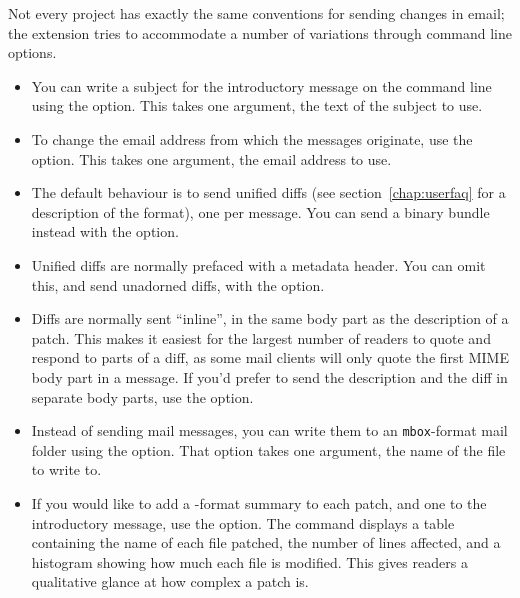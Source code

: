 Not every project has exactly the same conventions for sending changes
in email; the  extension tries to accommodate a
number of variations through command line options.
\begin{itemize}
\item You can write a subject for the introductory message on the
  command line using the  option.  This
  takes one argument, the text of the subject to use.
\item To change the email address from which the messages originate,
  use the  option.  This takes one
  argument, the email address to use.
\item The default behaviour is to send unified diffs (see
  section~\ref{chap:userfaq} for a description of the format), one per
  message.  You can send a binary bundle instead with the
   option.  
\item Unified diffs are normally prefaced with a metadata header.  You
  can omit this, and send unadorned diffs, with the
   option.
\item Diffs are normally sent ``inline'', in the same body part as the
  description of a patch.  This makes it easiest for the largest
  number of readers to quote and respond to parts of a diff, as some
  mail clients will only quote the first MIME body part in a message.
  If you'd prefer to send the description and the diff in separate
  body parts, use the  option.
\item Instead of sending mail messages, you can write them to an
  \texttt{mbox}-format mail folder using the
   option.  That option takes one
  argument, the name of the file to write to.
\item If you would like to add a -format summary to
  each patch, and one to the introductory message, use the
   option.  The 
  command displays a table containing the name of each file patched,
  the number of lines affected, and a histogram showing how much each
  file is modified.  This gives readers a qualitative glance at how
  complex a patch is.
\end{itemize}


